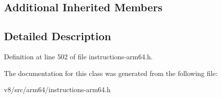 \subsection*{Additional Inherited Members}


\subsection{Detailed Description}


Definition at line 502 of file instructions-\/arm64.\+h.



The documentation for this class was generated from the following file\+:\begin{DoxyCompactItemize}
\item 
v8/src/arm64/instructions-\/arm64.\+h\end{DoxyCompactItemize}
